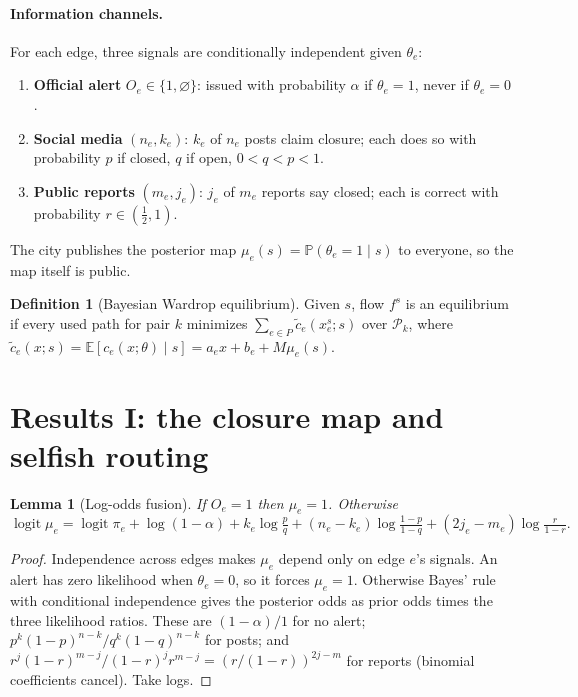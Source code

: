 \documentclass[11pt]{article}
\newtheorem{lemma}{Lemma}
\theoremstyle{definition}
\newtheorem{definition}{Definition}
\theoremstyle{remark}
\newcommand{\E}{\mathbb{E}}
\renewcommand{\Pr}{\mathbb{P}}
\newcommand{\logit}{\operatorname{logit}}
\newcommand{\1}{\mathbf{1}}
\begin{document}
\paragraph{Information channels.}
For each edge, three signals are conditionally independent given $\theta_e$:
\begin{enumerate}
\item \textbf{Official alert} $O_e\in\{1,\varnothing\}$: issued with
probability $\alpha$ if $\theta_e=1$, never if $\theta_e=0$.
\item \textbf{Social media} $(n_e,k_e)$: $k_e$ of $n_e$ posts claim closure;
each does so with probability $p$ if closed, $q$ if open, $0<q<p<1$.
\item \textbf{Public reports} $(m_e,j_e)$: $j_e$ of $m_e$ reports say
closed; each is correct with probability $r\in(\tfrac12,1)$.
\end{enumerate}
The city publishes the posterior map $\mu_e(s)=\Pr(\theta_e=1\mid s)$ to
everyone, so the map itself is public.

\begin{definition}[Bayesian Wardrop equilibrium]
Given $s$, flow $f^s$ is an equilibrium if every used path for pair $k$
minimizes $\sum_{e\in P}\tilde c_e(x^s_e;s)$ over $\mathcal P_k$, where
$\tilde c_e(x;s)=\E[c_e(x;\theta)\mid s]=a_ex+b_e+M\mu_e(s)$.
\end{definition}

\section{Results I: the closure map and selfish routing}

\begin{lemma}[Log-odds fusion]\label{lem:fusion}
If $O_e=1$ then $\mu_e=1$. Otherwise
\begin{equation}\label{eq:fusion}
\logit\mu_e=\logit\pi_e+\log(1-\alpha)
+k_e\log\tfrac{p}{q}+(n_e-k_e)\log\tfrac{1-p}{1-q}
+(2j_e-m_e)\log\tfrac{r}{1-r}.
\end{equation}
\end{lemma}

\begin{proof}
Independence across edges makes $\mu_e$ depend only on edge $e$'s signals.
An alert has zero likelihood when $\theta_e=0$, so it forces $\mu_e=1$.
Otherwise Bayes' rule with conditional independence gives the posterior odds
as prior odds times the three likelihood ratios. These are $(1-\alpha)/1$
for no alert; $p^k(1-p)^{n-k}/q^k(1-q)^{n-k}$ for posts; and
$r^j(1-r)^{m-j}/(1-r)^jr^{m-j}=(r/(1-r))^{2j-m}$ for reports (binomial
coefficients cancel). Take logs.
\end{proof}
\end{document}
